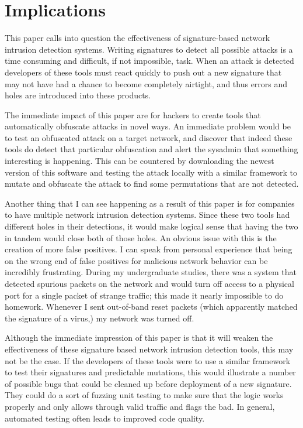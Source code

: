 \documentclass{reading_glasses}
\begin{document}
\section{Implications}
This paper calls into question the effectiveness of signature-based network intrusion detection systems.  Writing signatures to detect all possible attacks is a time consuming and difficult, if not impossible, task.  When an attack is detected developers of these tools must react quickly to push out a new signature that may not have had a chance to become completely airtight, and thus errors and holes are introduced into these products.  \cite{vigna2004testing}

The immediate impact of this paper are for hackers to create tools that automatically obfuscate attacks in novel ways.  An immediate problem would be to test an obfuscated attack on a target network, and discover that indeed these tools do detect that particular obfuscation and alert the sysadmin that something interesting is happening.  This can be countered by downloading the newest version of this software and testing the attack locally with a similar framework to mutate and obfuscate the attack to find some permutations that are not detected.  

Another thing that I can see happening as a result of this paper is for companies to have multiple network intrusion detection systems.  Since these two tools had different holes in their detections, it would make logical sense that having the two in tandem would close both of those holes.  An obvious issue with this is the creation of more false positives.  I can speak from personal experience that being on the wrong end of false positives for malicious network behavior can be incredibly frustrating.  During my undergraduate studies, there was a system that detected spurious packets on the network and would turn off access to a physical port for a single packet of strange traffic; this made it nearly impossible to do homework. Whenever I sent out-of-band reset packets (which apparently matched the signature of a virus,) my network was turned off.

Although the immediate impression of this paper is that it will weaken the effectiveness of these signature based network intrusion detection tools, this may not be the case.  If the developers of these tools were to use a similar framework to test their signatures and predictable mutations, this would illustrate a number of possible bugs that could be cleaned up before deployment of a new signature.  They could do a sort of fuzzing unit testing to make sure that the logic works properly and only allows through valid traffic and flags the bad.  In general, automated testing often leads to improved code quality.
\end{document}
